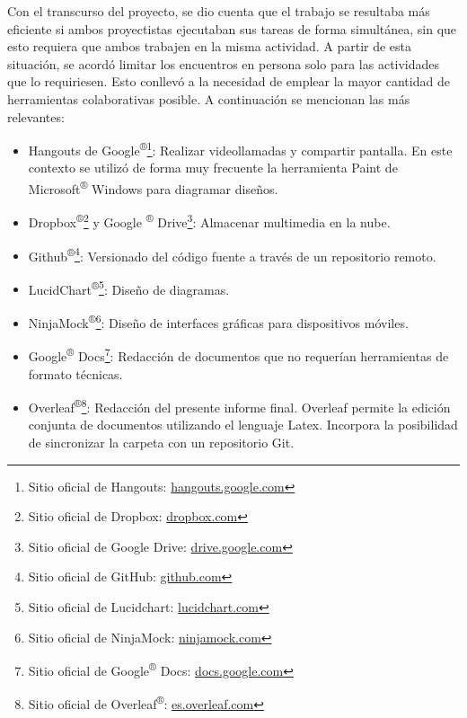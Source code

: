         \par Con el transcurso del proyecto, se dio cuenta que el trabajo se resultaba más eficiente si ambos proyectistas ejecutaban sus tareas de forma simultánea, sin que esto requiera que ambos trabajen en la misma actividad. A partir de esta situación, se acordó limitar los encuentros en persona solo para las actividades que lo requiriesen. Esto conllevó a la necesidad de emplear la mayor cantidad de herramientas colaborativas posible. A continuación se mencionan las más relevantes:
        \begin{itemize}
            
            \item Hangouts de Google\textsuperscript{®}\footnote{ Sitio oficial de Hangouts: \url{hangouts.google.com}}: Realizar videollamadas y compartir pantalla. En este contexto se utilizó de forma muy frecuente la herramienta Paint de Microsoft\textsuperscript{®} Windows para diagramar diseños.
            
            \item Dropbox\textsuperscript{®}\footnote{ Sitio oficial de Dropbox: \url{dropbox.com}} y Google \textsuperscript{®} Drive\footnote{ Sitio oficial de Google Drive: \url{drive.google.com}}: Almacenar multimedia en la nube.
            
            \item Github\textsuperscript{®}\footnote{ Sitio oficial de GitHub: \url{github.com}}: Versionado del código fuente a través de un repositorio remoto.
            
            \item LucidChart\textsuperscript{®}\footnote{ Sitio oficial de Lucidchart: \url{lucidchart.com}}: Diseño de diagramas.
            
            \item NinjaMock\textsuperscript{®}\footnote{ Sitio oficial de NinjaMock: \url{ninjamock.com}}: Diseño de interfaces gráficas para dispositivos móviles.
            
            \item Google\textsuperscript{®} Docs\footnote{ Sitio oficial de Google\textsuperscript{®} Docs: \url{docs.google.com}}: Redacción de documentos que no requerían herramientas de formato técnicas.
            
            \item Overleaf\textsuperscript{®}\footnote{ Sitio oficial de Overleaf\textsuperscript{®}: \url{es.overleaf.com}}: Redacción del presente informe final. Overleaf permite la edición conjunta de documentos utilizando el lenguaje Latex. Incorpora la posibilidad de sincronizar la carpeta con un repositorio Git.
            
        \end{itemize}
        
